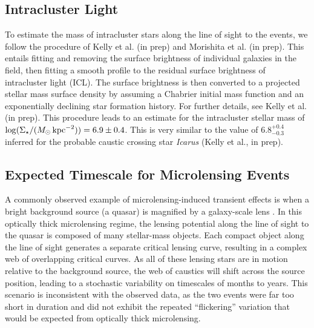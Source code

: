 \subsection{Intracluster Light}\label{sec:ICL}

To estimate the mass of intracluster stars along the line of sight to
the \spock events, we follow the procedure of Kelly et al. (in prep)
and Morishita et al. (in prep).  This entails fitting and removing the
surface brightness of individual galaxies in the field, then fitting a
smooth profile to the residual surface brightness of intracluster
light (ICL).  The surface brightness is then converted to a projected
stellar mass surface density by assuming a Chabrier
\cite{Chabrier:2003} initial mass function and an exponentially
declining star formation history.  For further details, see Kelly et
al. (in prep).  This procedure leads to an estimate for the
intracluster stellar mass of $\log (\Sigma_{\star} / (M_{\odot}\,{\rm
  kpc}^{-2})) = 6.9\pm0.4$.  This is very similar to the value of
$6.8^{+0.4}_{-0.3}$ inferred for the probable caustic crossing star
{\it Icarus} (Kelly et al., in prep).


\subsection{Expected Timescale for Microlensing Events}\label{sec:Microlensing}

A commonly observed example of microlensing-induced transient effects
is when a bright background source (a quasar) is magnified by a
galaxy-scale lens \citep{Wambsganss:2001, Kochanek:2004}.  In this
optically thick microlensing regime, the lensing potential along the
line of sight to the quasar is composed of many stellar-mass objects.
Each compact object along the line of sight generates a separate
critical lensing curve, resulting in a complex web of overlapping
critical curves. As all of these lensing stars are in motion relative
to the background source, the web of caustics will shift across the
source position, leading to a stochastic variability on timescales of
months to years.  This scenario is inconsistent with the observed
data, as the two \spock events were far too short in duration and did
not exhibit the repeated ``flickering'' variation that would be
expected from optically thick microlensing.


